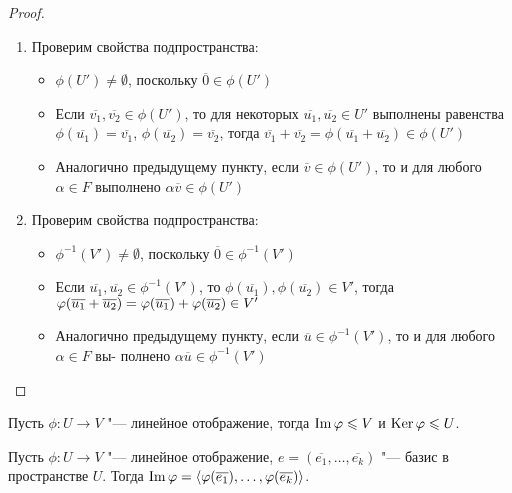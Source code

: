 \begin{proof}~
	\begin{enumerate}
		\item Проверим свойства подпространства:
		\begin{itemize}
			\item $\phi(U') \ne \emptyset$, поскольку $\overline{0} \in \phi(U')$
			
			\item Если $\overline{v_1}, \overline{v_2} \in \phi(U')$, то для некоторых $\overline{u_1}, \overline{u_2} \in U'$ выполнены равенства $\phi(\overline{u_1}) = \overline{v_1}$, $\phi(\overline{u_2}) = \overline{v_2}$, тогда $\overline{v_1} + \overline{v_2} = \phi(\overline{u_1} + \overline{u_2}) \in \phi(U')$
			
			\item Аналогично предыдущему пункту, если $\overline v \in \phi(U')$, то и для любого $\alpha \in F$ выполнено $\alpha \overline v \in \phi(U')$
		\end{itemize}
		
		\item Проверим свойства подпространства:
		\begin{itemize}
			\item $\phi^{-1}(V') \ne \emptyset$, поскольку $\overline{0} \in \phi^{-1}(V')$
			
			\item Если $\overline{u_1}, \overline{u_2} \in \phi^{-1}(V')$, то $\phi(\overline{u_1}), \phi(\overline{u_2}) \in V'$, тогда $\phi(\overline{u_1} \hm{+} \overline{u_2}) = \phi(\overline{u_1}) + \phi(\overline{u_2}) \in V'$
			
			\item Аналогично предыдущему пункту, если $\overline{u} \in \phi^{-1}(V')$, то и для любого $\alpha \in F$ вы-    полнено $\alpha \overline{u} \in \phi^{-1}(V')$\qedhere
		\end{itemize}
	\end{enumerate}
\end{proof}

\begin{corollary}
	Пусть $\phi: U \rightarrow V$ "--- линейное отображение, тогда $\operatorname{Im}{\varphi} \leqslant V$ и $\operatorname{Ker}{\varphi} \leqslant U$.
\end{corollary}

\begin{proposition}
	Пусть $\phi: U \rightarrow V$ "--- линейное отображение, $e = (\overline{e_1}, \dots ,\overline{e_k})$ "--- базис в пространстве $U$. Тогда $\im{\phi} \hm{=} \langle\phi(\overline{e_1}), \dots, \phi(\overline{e_k})\rangle$.
\end{proposition}

